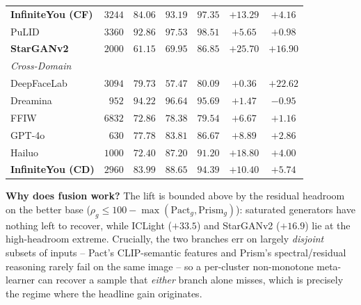 \documentclass[10pt,twocolumn,letterpaper]{article}
\newcommand{\vfive}{\textsc{Pact}}
\newcommand{\prism}{\textsc{Prism-SFT}}
\begin{document}
\begin{table}[t]
\begin{tabular}{l r c c c c c}
\textbf{InfiniteYou (CF)} & $3244$ & $84.06$ & $93.19$ & $\mathbf{97.35}$ & $+13.29$ & $+4.16$ \\
PuLID            & $3360$ & $92.86$ & $97.53$ & $\mathbf{98.51}$ & $+5.65$  & $+0.98$ \\
\textbf{StarGANv2} & $2000$ & $61.15$ & $69.95$ & $\mathbf{86.85}$ & $\mathbf{+25.70}$ & $\mathbf{+16.90}$ \\
\midrule
\multicolumn{7}{l}{\emph{Cross-Domain}} \\
DeepFaceLab      & $3094$ & $79.73$ & $57.47$ & $\mathbf{80.09}$ & $+0.36$  & $+22.62$ \\
Dreamina         & $952$  & $94.22$ & $96.64$ & $95.69$          & $+1.47$  & $-0.95$ \\
FFIW             & $6832$ & $72.86$ & $78.38$ & $\mathbf{79.54}$ & $+6.67$  & $+1.16$ \\
GPT-4o           & $630$  & $77.78$ & $83.81$ & $\mathbf{86.67}$ & $+8.89$  & $+2.86$ \\
Hailuo           & $1000$ & $72.40$ & $87.20$ & $\mathbf{91.20}$ & $+18.80$ & $+4.00$ \\
\textbf{InfiniteYou (CD)} & $2960$ & $83.99$ & $88.65$ & $\mathbf{94.39}$ & $+10.40$ & $+5.74$ \\
\bottomrule
\end{tabular}
\end{table}

\textbf{Why does fusion work?} The lift is bounded above by the residual headroom on the better base ($\rho_g \le 100-\max(\text{Pact}_g, \text{Prism}_g)$): saturated generators have nothing left to recover, while ICLight ($+33.5$) and StarGANv2 ($+16.9$) lie at the high-headroom extreme. Crucially, the two branches err on largely \emph{disjoint} subsets of inputs -- Pact's CLIP-semantic features and Prism's spectral/residual reasoning rarely fail on the same image -- so a per-cluster non-monotone meta-learner can recover a sample that \emph{either} branch alone misses, which is precisely the regime where the headline gain originates.

\end{document}

